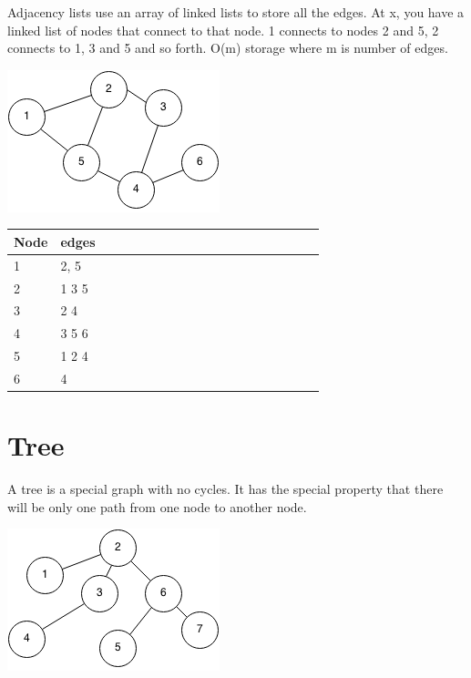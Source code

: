 \documentclass[11pt,oneside]{book}
\makeatletter
\def\maxwidth#1{\ifdim\Gin@nat@width>#1 #1\else\Gin@nat@width\fi}
\makeatother
\begin{document}
Adjacency lists use an array of linked lists to store all the edges. At x, you have a linked list of nodes that connect to 
that node. 1 connects to nodes 2 and 5, 2 connects to 1, 3 and 5 and so forth. O(m) storage where m is number of edges.

\vspace{5px}\includegraphics[width=\maxwidth{\textwidth}]{graph.png}

\vspace{10px}\begin{tabulary}{0.4\linewidth}{|l|l|l|l|l|l|l|l|l|l|l|l|l|l|l|l|l|l|l}\hline


  Node &
  edges\\
\hline


  1 &
  2, 5\\

  2 &
  1 3 5\\

  3 &
  2 4\\

  4 &
  3 5 6\\

  5 &
  1 2 4\\

  6 &
  4\\

\hline\end{tabulary}

    \chapter{ Tree }
        



A tree is a special graph with no cycles. It has the special property that there will be only one path from one node to another node.

\vspace{5px}\includegraphics[width=\maxwidth{\textwidth}]{treegraph.png}
\end{document}
